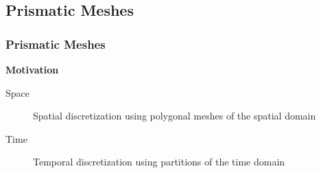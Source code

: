 \subsection{Prismatic Meshes}

\begin{frame}
    \frametitle{Prismatic Meshes}

    \vspace*{\fill}
    \begin{multicols}{2}
        
        \vspace*{\fill}
        \begin{center}
            {\color{\accentcolor} \Large \textbf{Motivation}}
            \vspace*{0.5cm}

            \begin{minipage}{0.4\textwidth}
                \begin{description}
                    \item[Space] Spatial discretization using polygonal meshes of the spatial domain
                    \item[Time] Temporal discretization using partitions of the time domain
                \end{description}
            \end{minipage}
        \end{center}
        \vspace*{\fill}

        \vfill\null
        \columnbreak

        \vspace*{\fill}
        \begin{figure}[!ht]
            \centering
            
        \end{figure}
        \vspace*{\fill}

    \end{multicols}
    \vspace*{\fill}
    
\end{frame}

